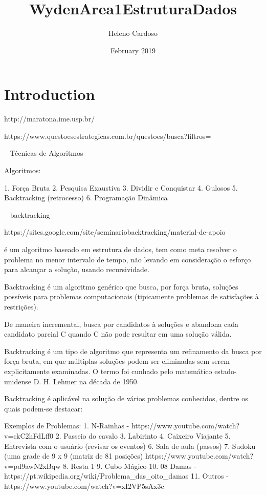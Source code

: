 \documentclass{article}
\title{WydenArea1EstruturaDados}
\author{Heleno Cardoso}
\date{February 2019}
\begin{document}
\maketitle

\section{Introduction}
http://maratona.ime.usp.br/

https://www.questoesestrategicas.com.br/questoes/busca?filtros=%

-- Técnicas de Algoritmos

Algoritmos:

1. Força Bruta
2. Pesquisa Exaustiva
3. Dividir e Conquistar
4. Gulosos
5. Backtracking (retrocesso)
6. Programação Dinâmica

-- backtracking

https://sites.google.com/site/seminariobacktracking/material-de-apoio

é um algoritmo baseado em estrutura de dados, tem como meta resolver o problema no menor intervalo de tempo, não levando em consideração o esforço para alcançar a solução, usando recursividade.

Backtracking é um algoritmo genérico que busca, por força bruta, soluções possíveis para problemas computacionais (tipicamente problemas de satisfações à restrições).

De maneira incremental, busca por candidatos à soluções e abandona cada candidato parcial C quando C não pode resultar em uma solução válida.

Backtracking é um tipo de algoritmo que representa um refinamento da busca por força bruta, em que múltiplas soluções podem ser eliminadas sem serem explicitamente examinadas. O termo foi cunhado pelo matemático estado-unidense D. H. Lehmer na década de 1950.

Backtracking é aplicável na solução de vários problemas conhecidos, dentre os quais podem-se destacar:

Exemplos de Problemas:
1. N-Rainhas - https://www.youtube.com/watch?v=ckC2hFdLff0
2. Passeio do cavalo
3. Labirinto 
4. Caixeiro Viajante 
5. Entrevista com o usuário (revisar os eventos)
6. Sala de aula (passos)
7. Sudoku (uma grade de 9 x 9 (matriz de 81 posições) https://www.youtube.com/watch?v=pd9awN2xBqw
8. Resta 1
9. Cubo Mágico
10. 08 Damas - https://pt.wikipedia.org/wiki/Problema_das_oito_damas
11. Outros - https://www.youtube.com/watch?v=xI2VP5sAx3c
\end{document}
